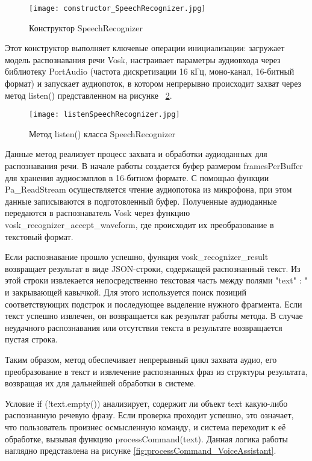 \begin{figure}[H]
	\centering
	\texttt{[image: constructor\_SpeechRecognizer.jpg]}
	\caption{Конструктор SpeechRecognizer}
		\label{fig:constructor_SpeechRecognizer}
\end{figure}
Этот конструктор выполняет ключевые операции инициализации: загружает модель распознавания речи Vosk, настраивает параметры аудиовхода через библиотеку PortAudio (частота дискретизации 16 кГц, моно-канал, 16-битный формат) и запускает аудиопоток, в котором непрерывно происходит захват  через метод listen() представленном на рисунке ~\ref{fig:listenSpeechRecognizer}.

\begin{figure}[H]
	\centering
	\texttt{[image: listenSpeechRecognizer.jpg]}
	\caption{Метод listen() класса SpeechRecognizer}
	\label{fig:listenSpeechRecognizer}
\end{figure}

Данные метод реализует процесс захвата и обработки аудиоданных для распознавания речи. В начале работы создается буфер размером framesPerBuffer для хранения аудиосэмплов в 16-битном формате. С помощью функции Pa\_ReadStream осуществляется чтение аудиопотока из микрофона, при этом данные записываются в подготовленный буфер. Полученные аудиоданные передаются в распознаватель Vosk через функцию vosk\_recognizer\_accept\_waveform, где происходит их преобразование в текстовый формат.

Если распознавание прошло успешно, функция vosk\_recognizer\_result возвращает результат в виде JSON-строки, содержащей распознанный текст. Из этой строки извлекается непосредственно текстовая часть между полями \string"text\string" : \string" и закрывающей кавычкой. Для этого используется поиск позиций соответствующих подстрок и последующее выделение нужного фрагмента. Если текст успешно извлечен, он возвращается как результат работы метода. В случае неудачного распознавания или отсутствия текста в результате возвращается пустая строка.

Таким образом, метод обеспечивает непрерывный цикл захвата аудио, его преобразование в текст и извлечение распознанных фраз из структуры результата, возвращая их для дальнейшей обработки в системе.

Условие if (!text.empty()) анализирует, содержит ли объект text какую-либо распознанную речевую фразу. Если проверка проходит успешно, это означает, что пользователь произнес осмысленную команду, и система переходит к её обработке, вызывая функцию processCommand(text). Данная логика работы наглядно представлена на рисунке \ref{fig:processCommand_VoiceAssistant}.

